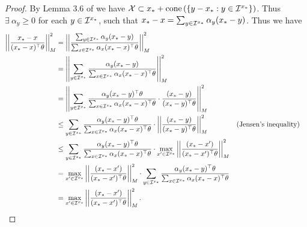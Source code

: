 \begin{proof}
     By Lemma 3.6 of \cite{Ziegler1995} we have $\mathcal{X} \subset x_* + \text{cone}\left(\{y -x_*: y \in \mathcal{I}^{x_*}\}\right)$. Thus $\exists~\alpha_y \geq 0$ for each $y \in \mathcal{I}^{x_*}$, such that $x_*-x = \sum_{y \in \mathcal{I}^{x_*}} \alpha_y (x_*-y)$. Thus we have 
    \begin{align*}
        \left|\left|\frac{x_* - x}{(x_* - x)^{\top}\theta}\right|\right|_{M}^2 &= \left|\left|\frac{\sum_{y \in \mathcal{I}^{x_*}} \alpha_y (x_*-y)}{\sum_{x \in \mathcal{I}^{x_*}} \alpha_x (x_*-x)^{\top}\theta}\right|\right|_{M}^2 \\
        &= \left|\left|\sum_{y \in \mathcal{I}^{x_*}} \frac{\alpha_y (x_*-y)}{\sum_{x \in \mathcal{I}^{x_*}} \alpha_x (x_*-x)^{\top}\theta}\right|\right|_{M}^2 \\
        &= \left|\left|\sum_{y \in \mathcal{I}^{x_*}} \frac{\alpha_y (x_*-y)^\top\theta}{\sum_{x \in \mathcal{I}^{x_*}} \alpha_x (x_*-x)^{\top}\theta} \cdot \frac{ (x_*-y)}{(x_*-y)^\top\theta}\right|\right|_{M}^2 \\
        &\leq \sum_{y \in \mathcal{I}^{x_*}}\frac{\alpha_y (x_*-y)^\top\theta}{\sum_{x \in \mathcal{I}^{x_*}} \alpha_x (x_*-x)^{\top}\theta} \cdot \left|\left|  \frac{ (x_*-y)}{(x_*-y)^\top\theta}\right|\right|_{M}^2 && \text{(Jensen's inequality)} \\
        &\leq \sum_{y \in \mathcal{I}^{x_*}}\frac{\alpha_y (x_*-y)^\top\theta}{\sum_{x \in \mathcal{I}^{x_*}} \alpha_x (x_*-x)^{\top}\theta}\cdot\max_{x' \in \mathcal{I}^{x_*}}\left|\left|  \frac{ (x_*-x')}{(x_*-x')^\top\theta}\right|\right|_{M}^2 \\
        &= \max_{x' \in \mathcal{I}^{x_*}}\left|\left|  \frac{ (x_*-x')}{(x_*-x')^\top\theta}\right|\right|_{M}^2 \cdot \sum_{y \in \mathcal{I}^{x_*}}\frac{\alpha_y (x_*-y)^\top\theta}{\sum_{x \in \mathcal{I}^{x_*}} \alpha_x (x_*-x)^{\top}\theta}\\
        &= \max_{x' \in \mathcal{I}^{x_*}}\left|\left|  \frac{ (x_*-x')}{(x_*-x')^\top\theta}\right|\right|_{M}^2.
    \end{align*}
\end{proof}
